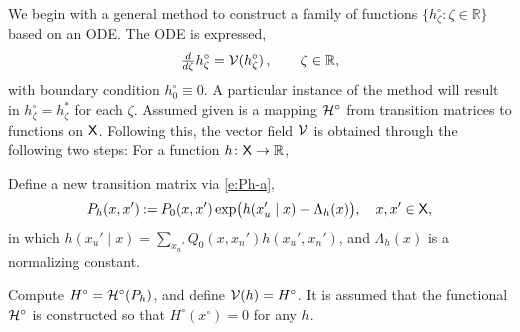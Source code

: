 \documentclass[final,12pt]{colt2018} %
\def\xz{x^\circ}
\def\EFn#1{\Lambda_{#1}}
\def\preclH{{\cal H}^\circ}
\def\preH{H^\circ}  %
\def\state{{\sf X}}
\def\staten{{\sf X}_{\sf n}}
\newcommand{\field}[1]{\mathbb{#1}}
\def\Re{\field{R}}
\def\clV{{\cal V}}
\def\FRAC#1#2#3{\genfrac{}{}{}{#1}{#2}{#3}}
\def\ddzeta{{\mathchoice{\FRAC{1}{d}{d\zeta}}%
{\FRAC{1}{d}{d\zeta}}%
{\FRAC{3}{d}{d\zeta}}%
{\FRAC{3}{d}{d\zeta}}}}
\def\eqdef{\mathbin{:=}}
\def\Theorem#1{Theorem~\ref{#1}}
\newcounter{rmnumx}
\newenvironment{romannumx}{\begin{list}{{\upshape (\roman{rmnumx})}}{\usecounter{rmnumx}
\setlength{\leftmargin}{2pt}
\setlength{\rightmargin}{4pt}
\setlength{\itemsep}{3pt}
\setlength{\itemindent}{18pt}
}}{\end{list}}
\def\Re{\field{R}}
\begin{document}
 


We begin with a general method to construct  a family of functions $\{h_\zeta^\circ : \zeta\in\Re\}$ based on an ODE.     The ODE is expressed,  
\begin{equation}
\ddzeta h_\zeta^\circ  =  \clV(h_\zeta^\circ)\,,\qquad \zeta\in\Re,
\label{e:hODE}
\end{equation}
with boundary condition $h_0^\circ\equiv 0$.  A particular instance of the method will result in $h_\zeta^\circ = h_\zeta^*$ for each $\zeta$.
 Assumed given is a mapping $\preclH$ from transition matrices to functions on $\state$.   Following this, the vector field $\clV$ is obtained through the following two steps:  For a function $h\colon\state\to\Re$,  
\begin{romannumx}
\item Define a new transition matrix via \eqref{e:Ph-a},
\begin{equation}
P_h(x,x') \eqdef P_0(x,x')\exp\bigl(  h(x_u' \mid x)  -  \EFn{h}(x)    \bigr),\quad x,x'\in\state,
\label{e:Ph}
\end{equation}
in which $  h(x_u' \mid x) = \sum_{x_n'} Q_0(x,x_n') h(x_u',x_n')$,  and $ \EFn{h}(x)  $ is a normalizing constant.   


\item  Compute $\preH = \preclH(P_h)$, and define $\clV(h) = \preH$.
It is assumed   that the functional $\preclH$ is constructed so that  $ \preH(\xz)=0$ for any $h$.

\end{romannumx}

   

 
\end{document}
